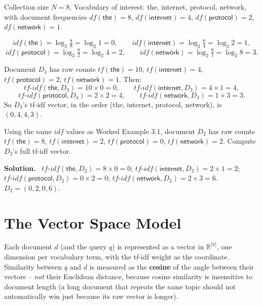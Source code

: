 \documentclass[11pt, a4paper]{article}
\newcommand{\Solution}{\medskip\noindent\textbf{\color{exgreen}Solution.}\ }
\begin{document}
\begin{examplebox}
Collection size $N=8$. Vocabulary of interest: \textsf{the}, \textsf{internet}, \textsf{protocol}, \textsf{network}, with document frequencies $df(\textsf{the})=8$, $df(\textsf{internet})=4$, $df(\textsf{protocol})=2$, $df(\textsf{network})=1$.

\[
idf(\textsf{the}) = \log_2\tfrac{8}{8} = \log_2 1 = 0, \qquad
idf(\textsf{internet}) = \log_2\tfrac{8}{4} = \log_2 2 = 1,
\]
\[
idf(\textsf{protocol}) = \log_2\tfrac{8}{2} = \log_2 4 = 2, \qquad
idf(\textsf{network}) = \log_2\tfrac{8}{1} = \log_2 8 = 3.
\]

Document $D_3$ has raw counts $tf(\textsf{the})=10$, $tf(\textsf{internet})=4$, $tf(\textsf{protocol})=2$, $tf(\textsf{network})=1$. Then:
\[
tf\text{-}idf(\textsf{the},D_3) = 10\times 0 = 0, \qquad tf\text{-}idf(\textsf{internet},D_3)=4\times1=4,
\]
\[
tf\text{-}idf(\textsf{protocol},D_3)=2\times2=4, \qquad tf\text{-}idf(\textsf{network},D_3)=1\times3=3.
\]
So $D_3$'s tf-idf vector, in the order (the, internet, protocol, network), is $(0,4,4,3)$.
\end{examplebox}

\begin{exercisebox}
Using the same $idf$ values as Worked Example 3.1, document $D_2$ has raw counts $tf(\textsf{the})=8$, $tf(\textsf{internet})=2$, $tf(\textsf{protocol})=0$, $tf(\textsf{network})=2$. Compute $D_2$'s full tf-idf vector.
\end{exercisebox}

\Solution
$tf\text{-}idf(\textsf{the},D_2)=8\times0=0$; $tf\text{-}idf(\textsf{internet},D_2)=2\times1=2$; $tf\text{-}idf(\textsf{protocol},D_2)=0\times2=0$; $tf\text{-}idf(\textsf{network},D_2)=2\times3=6$.\\
$D_2 = (0,2,0,6)$.

\section{The Vector Space Model}

\begin{defbox}
Each document $d$ (and the query $q$) is represented as a vector in $\mathbb{R}^{|V|}$, one dimension per vocabulary term, with the tf-idf weight as the coordinate. Similarity between $q$ and $d$ is measured as the \textbf{cosine} of the angle between their vectors -- \emph{not} their Euclidean distance, because cosine similarity is insensitive to document length (a long document that repeats the same topic should not automatically win just because its raw vector is longer).
\end{defbox}
\end{document}
